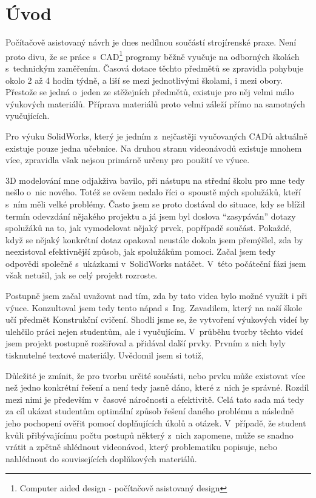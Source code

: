 \chapter*{Úvod}
Počítačově asistovaný návrh je dnes nedílnou součástí strojírenské praxe.
Není proto divu, že se práce s~CAD\footnote{Computer aided design - počítačově asistovaný design} programy běžně vyučuje na odborných školách s~technickým zaměřením.
Časová dotace těchto předmětů se zpravidla pohybuje okolo 2 až 4 hodin týdně, a liší se mezi jednotlivými školami, i mezi obory.
Přestože se jedná o~jeden ze stěžejních předmětů, existuje pro něj velmi málo výukových materiálů.
Příprava materiálů proto velmi záleží přímo na samotných vyučujících.

Pro výuku SolidWorks, který je jedním z~nejčastěji vyučovaných CADů aktuálně existuje pouze jedna učebnice.
Na druhou stranu videonávodů existuje mnohem více, zpravidla však nejsou primárně určeny pro použití ve výuce.

3D modelování mne odjakživa bavilo, při nástupu na střední školu pro mne tedy nešlo o~nic nového.
Totéž se ovšem nedalo říci o~spoustě mých spolužáků, kteří s~ním měli velké problémy.
Často jsem se proto dostával do situace, kdy se blížil termín odevzdání nějakého projektu a já jsem byl doslova \enquote{zasypáván} dotazy spolužáků na to, jak vymodelovat nějaký prvek, popřípadě součást.
Pokaždé, když se nějaký konkrétní dotaz opakoval neustále dokola jsem přemýšlel, zda by neexistoval efektivnější způsob, jak spolužákům pomoci.
Začal jsem tedy odpovědi společně s~ukázkami v~SolidWorks natáčet.
V~této počáteční fázi jsem však netušil, jak se celý projekt rozroste.

Postupně jsem začal uvažovat nad tím, zda by tato videa bylo možné využít i při výuce.
Konzultoval jsem tedy tento nápad s~Ing. Zavadilem, který na naší škole učí předmět Konstrukční cvičení.
Shodli jsme se, že vytvoření výukových videí by ulehčilo práci nejen studentům, ale i vyučujícím.
V~průběhu tvorby těchto videí jsem projekt postupně rozšiřoval a přidával další prvky.
Prvním z nich byly tisknutelné textové materiály.
Uvědomil jsem si totiž, 

Důležité je zmínit, že pro tvorbu určité součásti, nebo prvku může existovat více než jedno konkrétní řešení a není tedy jasně dáno, které z~nich je správné.
Rozdíl mezi nimi je především v~časové náročnosti a efektivitě.
Celá tato sada má tedy za cíl ukázat studentům optimální způsob řešení daného problému a následně jeho pochopení ověřit pomocí doplňujících úkolů a otázek.
V~případě, že student kvůli přibývajícímu počtu postupů některý z~nich zapomene, může se snadno vrátit a zpětně shlédnout videonávod, který problematiku popisuje, nebo nahlédnout do souvisejících doplňkových materiálů.

\B{\textcolor{red}{PŠ: Dopsat, že vytvářím výukovou sadu a z čeho se skládá.}}

\newpage
